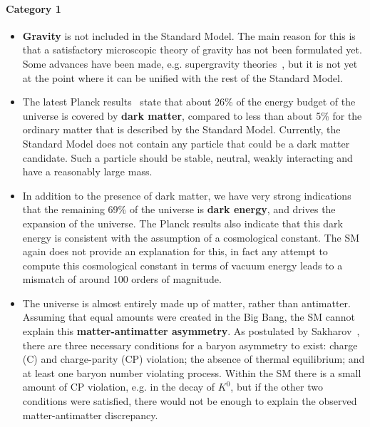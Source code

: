 \paragraph{Category 1}
\begin{itemize}
  \item \textbf{Gravity} is not included in the Standard Model. The main reason for this is that
a satisfactory microscopic theory of gravity has not been formulated yet. Some advances have been
made, e.g. supergravity
theories~\cite{VanNieuwenhuizen:1981ae,freedman2012supergravity,Nastase:2011aa}, but it is not yet
at the point where it can be unified with the rest of the Standard Model. 

  \item The latest Planck results~\cite{Planck:2015xua} state that about 26\% of the energy budget
of the universe is covered by \textbf{dark matter}, compared to less than about 5\% for the ordinary
matter that is described by the Standard Model. Currently, the Standard Model does not contain any
particle that could be a dark matter candidate. Such a particle should be stable, neutral, weakly
interacting and have a reasonably large mass. 

  \item In addition to the presence of dark matter, we have very strong indications that
the remaining 69\% of the universe is \textbf{dark energy}, and drives the expansion of the
universe. The Planck results also indicate that this dark energy is consistent with the assumption
of a cosmological constant. The SM again does not provide an explanation for this, in fact any
attempt to compute this cosmological constant in terms of vacuum energy leads to a mismatch of
around 100 orders of magnitude. 

  \item The universe is almost entirely made up of matter, rather than antimatter. Assuming that
equal amounts were created in the Big Bang, the SM cannot explain this \textbf{matter-antimatter
asymmetry}. As postulated by Sakharov~\cite{Sakharov}, there are three necessary conditions for a
baryon asymmetry to exist: charge (C) and charge-parity (CP) violation; the absence of thermal
equilibrium; and at least one baryon number violating process. Within the SM there is a small amount
of CP violation, e.g. in the decay of $K^0$, but if the other two conditions were satisfied, there
would not be enough to explain the observed matter-antimatter discrepancy. 
  

\end{itemize}
